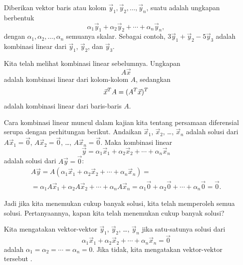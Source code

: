 Diberikan vektor baris atau kolom $\vec{y}_1, \vec{y}_2, \ldots, \vec{y}_n$,
suatu \emph{} adalah ungkapan berbentuk
\begin{equation*}
\alpha_1 \vec{y}_1 +
\alpha_2 \vec{y}_2 +
\cdots +
\alpha_n \vec{y}_n ,
\end{equation*}
dengan $\alpha_1, \alpha_2, \ldots, \alpha_n$ semuanya skalar.
Sebagai contoh,
$3 \vec{y}_1 + \vec{y}_2 - 5 \vec{y}_3$ adalah kombinasi linear
dari $\vec{y}_1$, $\vec{y}_2$, dan $\vec{y}_3$.

Kita telah melihat kombinasi linear sebelumnya. Ungkapan
\begin{equation*}
A \vec{x}
\end{equation*}
adalah kombinasi linear dari kolom-kolom $A$, sedangkan
\begin{equation*}
\vec{x}^T A = (A^T \vec{x})^T
\avoidbreak
\end{equation*}
adalah kombinasi linear dari baris-baris $A$.

Cara kombinasi linear muncul dalam kajian kita tentang persamaan
diferensial serupa dengan perhitungan berikut. Andaikan
$\vec{x}_1$, $\vec{x}_2$, \ldots, $\vec{x}_n$ adalah solusi
dari $A \vec{x}_1 = \vec{0}$,
$A \vec{x}_2 = \vec{0}$, \ldots,
$A \vec{x}_n = \vec{0}$.
Maka kombinasi linear
\begin{equation*}
\vec{y} = \alpha_1 \vec{x}_1 +
\alpha_2 \vec{x}_2 +
\cdots +
\alpha_n \vec{x}_n
\end{equation*}
adalah solusi dari $A \vec{y} = \vec{0}$:
\begin{multline*}
A \vec{y} =
A (\alpha_1 \vec{x}_1 +
\alpha_2 \vec{x}_2 +
\cdots +
\alpha_n \vec{x}_n )
=
\\
=
\alpha_1 A \vec{x}_1 +
\alpha_2 A \vec{x}_2 +
\cdots +
\alpha_n A \vec{x}_n
=
\alpha_1 \vec{0} +
\alpha_2 \vec{0} +
\cdots +
\alpha_n \vec{0} = \vec{0} .
\end{multline*}

Jadi jika kita menemukan cukup banyak solusi, kita telah memperoleh semua solusi. Pertanyaannya,
kapan kita telah menemukan cukup banyak solusi?

Kita mengatakan vektor-vektor $\vec{y}_1$, $\vec{y}_2$, \ldots, $\vec{y}_n$
\emph{} jika satu-satunya solusi dari
\begin{equation*}
\alpha_1 \vec{x}_1 +
\alpha_2 \vec{x}_2 +
\cdots +
\alpha_n \vec{x}_n
=
\vec{0}
\end{equation*}
adalah $\alpha_1 = \alpha_2 = \cdots = \alpha_n = 0$.
Jika tidak, kita mengatakan vektor-vektor tersebut \emph{}.

